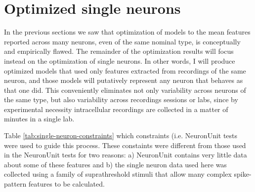 \section{Optimized single neurons}
\label{sec:optimized-single-neurons}
In the previous sections we saw that optimization of models to the mean features reported across many neurons, even of the same nominal type, is conceptually and empirically flawed.
The remainder of the optimization results will focus instead on the optimization of single neurons.
In other words, I will produce optimized models that used only features extracted from recordings of the same neuron, and those models will putatively represent any neuron that behaves as that one did.
This conveniently eliminates not only variability across neurons of the same type, but also variability across recordings sessions or labs, since by experimental necessity intracellular recordings are collected in a matter of minutes in a single lab.

Table \ref{tab:single-neuron-constraints} which constraints (i.e. NeuronUnit tests were used to guide this process.  
These constaints were different from those used in the NeuronUnit tests for two reasons: a) NeuronUnit contains very little data about some of these features and b) the single neuron data used here was collected using a family of suprathreshold stimuli that allow many complex spike-pattern features to be calculated.

